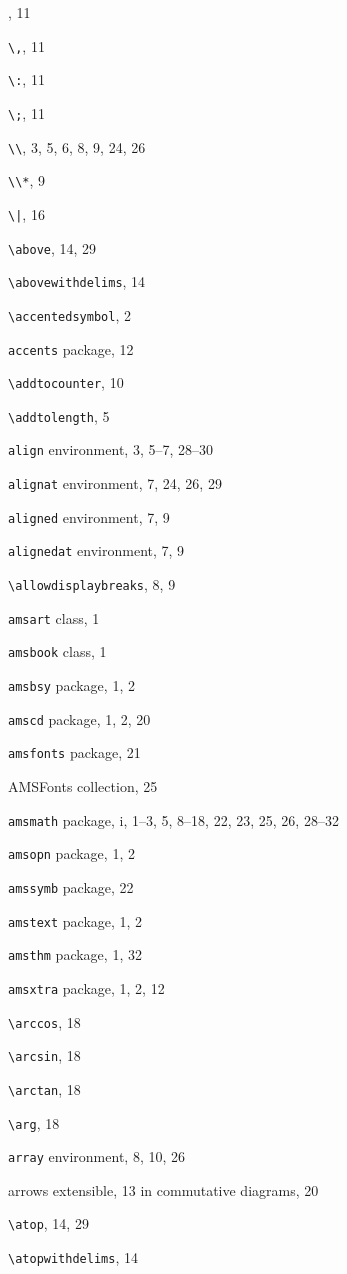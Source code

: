 \documentclass[leqno,titlepage,openany]{amsldoc}[1999/12/13]
\begin{document}
\begin{theindex}

  \item {\normalfont  \ttfamily  \bslchar \qcbang  }, 11
  \item \verb*+\,+, 11
  \item \verb*+\:+, 11
  \item \verb*+\;+, 11
  \item \verb*+\\+, 3, 5, 6, 8, 9, 24, 26
  \item \verb*+\\*+, 9
  \item \verb*+\|+, 16

  \indexspace

  \item \verb*+\above+, 14, 29
  \item \verb*+\abovewithdelims+, 14
  \item \verb*+\accentedsymbol+, 2
  \item \texttt{accents} package, 12
  \item \verb*+\addtocounter+, 10
  \item \verb*+\addtolength+, 5
  \item \texttt{align} environment, 3, 5--7, 28--30
  \item \texttt{alignat} environment, 7, 24, 26, 29
  \item \texttt{aligned} environment, 7, 9
  \item \texttt{alignedat} environment, 7, 9
  \item \verb*+\allowdisplaybreaks+, 8, 9
  \item \texttt{amsart} class, 1
  \item \texttt{amsbook} class, 1
  \item \texttt{amsbsy} package, 1, 2
  \item \texttt{amscd} package, 1, 2, 20
  \item \texttt{amsfonts} package, 21
  \item AMSFonts collection, 25
  \item \texttt{amsmath} package, i, 1--3, 5, 8--18, 22, 23, 25, 26,
		28--32
  \item \texttt{amsopn} package, 1, 2
  \item \texttt{amssymb} package, 22
  \item \texttt{amstext} package, 1, 2
  \item \texttt{amsthm} package, 1, 32
  \item \texttt{amsxtra} package, 1, 2, 12
  \item \verb*+\arccos+, 18
  \item \verb*+\arcsin+, 18
  \item \verb*+\arctan+, 18
  \item \verb*+\arg+, 18
  \item \texttt{array} environment, 8, 10, 26
  \item arrows
    \subitem extensible, 13
    \subitem in commutative diagrams, 20
  \item \verb*+\atop+, 14, 29
  \item \verb*+\atopwithdelims+, 14


\end{theindex}
\end{document}
